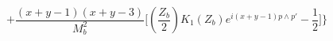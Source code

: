 \begin{equation}+\frac{(x+y-1)(x+y-3)}{M_{b}^{2}}\biggl[ \left(\frac{Z_{b}}{2}\right)K_{1}(Z_{b})e^{i(x+y-1)p\wedge p'}
-\frac{1}{2}\biggr]\biggr\}
\end{equation}\
